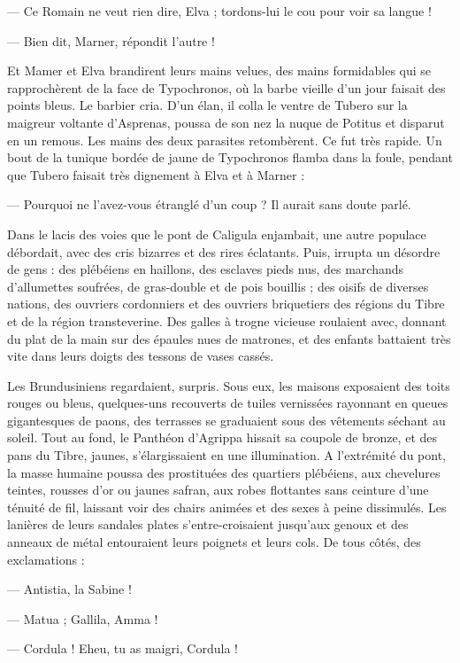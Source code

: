 \documentclass[a4paper, 11pt, oneside, polutonikogreek, french]{article}
\begin{document}
--- Ce Romain ne veut rien dire, Elva ; tordons-lui le cou pour voir sa langue !

--- Bien dit, Marner, répondit l'autre !

Et Mamer et Elva brandirent leurs mains velues, des mains formidables qui se rapprochèrent de la face de Typochronos, où la barbe vieille d'un jour faisait des points bleus. Le barbier cria. D'un élan, il colla le ventre de Tubero sur la maigreur voltante d'Asprenas, poussa de son nez la nuque de Potitus et disparut en un remous. Les mains des deux parasites retombèrent. Ce fut très rapide. Un bout de la tunique bordée de jaune de Typochronos flamba dans la foule, pendant que Tubero faisait très dignement à Elva et à Marner :

--- Pourquoi ne l'avez-vous étranglé d'un coup ? Il aurait sans doute parlé.

Dans le lacis des voies que le pont de Caligula enjambait, une autre populace débordait, avec des cris bizarres et des rires éclatants. Puis, irrupta un désordre de gens : des plébéiens en haillons, des esclaves pieds nus, des marchands d'allumettes soufrées, de gras-double et de pois bouillis ; des oisifs de diverses nations, des ouvriers cordonniers et des ouvriers briquetiers des régions du Tibre et de la région transteverine. Des galles à trogne vicieuse roulaient avec, donnant du plat de la main sur des épaules nues de matrones, et des enfants battaient très vite dans leurs doigts des tessons de vases cassés.

Les Brundusiniens regardaient, surpris. Sous eux, les maisons exposaient des toits rouges ou bleus, quelques-uns recouverts de tuiles vernissées rayonnant en queues gigantesques de paons, des terrasses se graduaient sous des vêtements séchant au soleil. Tout au fond, le Panthéon d’Agrippa hissait sa coupole de bronze, et des pans du Tibre, jaunes, s'élargissaient en une illumination. A l'extrémité du pont, la masse humaine poussa des prostituées des quartiers plébéiens, aux chevelures teintes, rousses d'or ou jaunes safran, aux robes flottantes sans ceinture d'une ténuité de fil, laissant voir des chairs animées et des sexes à peine dissimulés. Les lanières de leurs sandales plates s'entre-croisaient jusqu'aux genoux et des anneaux de métal entouraient leurs poignets et leurs cols. De tous côtés, des exclamations :

--- Antistia, la Sabine !

--- Matua ; Gallila, Amma !

--- Cordula ! Eheu, tu as maigri, Cordula !
\end{document}
